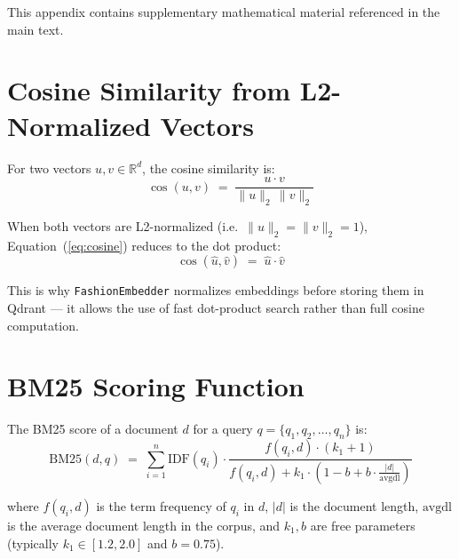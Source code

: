 This appendix contains supplementary mathematical material referenced in the main text.

\section{Cosine Similarity from L2-Normalized Vectors}

For two vectors $u, v \in \mathbb{R}^d$, the cosine similarity is:
\begin{equation}
\label{eq:cosine}
\cos(u, v) \;=\; \frac{u \cdot v}{\|u\|_2 \, \|v\|_2}
\end{equation}

When both vectors are L2-normalized (i.e.\ $\|u\|_2 = \|v\|_2 = 1$), Equation~(\ref{eq:cosine}) reduces to the dot product:
\begin{equation}
\label{eq:dotprod}
\cos(\hat{u}, \hat{v}) \;=\; \hat{u} \cdot \hat{v}
\end{equation}

This is why \texttt{FashionEmbedder} normalizes embeddings before storing them in Qdrant --- it allows the use of fast dot-product search rather than full cosine computation.

\section{BM25 Scoring Function}

The BM25 score of a document $d$ for a query $q = \{q_1, q_2, \ldots, q_n\}$ is:
\begin{equation}
\label{eq:bm25}
\text{BM25}(d, q) \;=\; \sum_{i=1}^{n} \text{IDF}(q_i) \cdot \frac{f(q_i, d) \cdot (k_1 + 1)}{f(q_i, d) + k_1 \cdot \left(1 - b + b \cdot \frac{|d|}{\text{avgdl}}\right)}
\end{equation}

where $f(q_i, d)$ is the term frequency of $q_i$ in $d$, $|d|$ is the document length, $\text{avgdl}$ is the average document length in the corpus, and $k_1, b$ are free parameters (typically $k_1 \in [1.2, 2.0]$ and $b = 0.75$).
